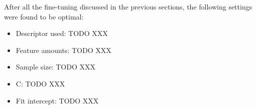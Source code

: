 After all the fine-tuning discussed in the previous sections, the following settings were found to be optimal:
\begin{itemize}
    \item Descriptor used: TODO XXX
    \item Feature amounts: TODO XXX
    \item Sample size: TODO XXX
    \item C: TODO XXX
    \item Fit intercept: TODO XXX
\end{itemize}

